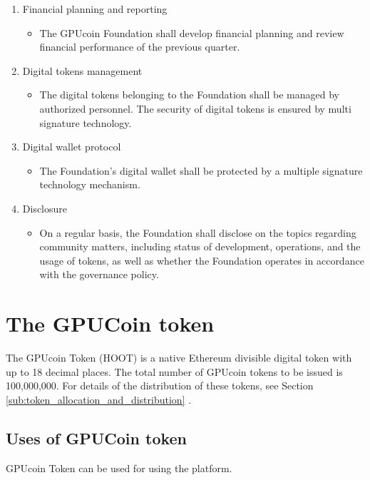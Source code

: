 \documentclass{article}
\begin{document}
\begin{enumerate}
 \item Financial planning and reporting
 \begin{itemize}
 \item The GPUcoin Foundation shall develop financial planning and review financial performance of the previous quarter.
 \end{itemize}

 \item Digital tokens management
 \begin{itemize}
 \item The digital tokens belonging to the Foundation shall be managed by authorized personnel. The security of digital tokens is ensured by multi signature technology.
 \end{itemize}

 \item Digital wallet protocol
 \begin{itemize}
 \item The Foundation’s digital wallet shall be protected by a multiple signature technology mechanism.
 \end{itemize}

 \item Disclosure
 \begin{itemize}
 \item On a regular basis, the Foundation shall disclose on the topics regarding community matters, including status of development, operations, and the usage of tokens, as well as whether the Foundation operates in accordance with the governance policy.
 \end{itemize}
\end{enumerate}


\section{The GPUCoin token}
The GPUcoin Token (HOOT) is a native Ethereum divisible digital token with up to 18 decimal places. The total number of GPUcoin tokens to be issued is 100,000,000. For details of the distribution of these tokens, see Section \ref{sub:token_allocation_and_distribution} .

\subsection{Uses of GPUCoin token} %
\label{sub:uses_of_hoot_token}
GPUcoin Token can be used for using the platform.

\end{document}
